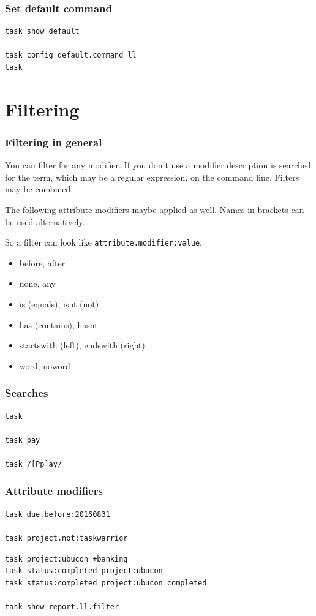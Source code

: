 \documentclass[t,handout]{beamer}
\begin{document}
\begin{frame}[fragile]\frametitle{Set default command}
    \vfill
    \begin{lstlisting}
task show default

task config default.command ll
task\end{lstlisting}
\end{frame}

\section{Filtering}

\begin{frame}[fragile]\frametitle{Filtering in general}
    You can filter for any modifier. If you don't use a modifier description is searched for the term, which may be a regular expression, on the command line. Filters may be combined.

    The following attribute modifiers maybe applied as well. Names in brackets can be used alternatively.

    So a filter can look like \verb=attribute.modifier:value=.

    \begin{itemize}
        \item before, after
        \item none, any
        \item is (equals), isnt (not)
        \item has (contains), hasnt
        \item startswith (left), endswith (right)
        \item word, noword
    \end{itemize}
\end{frame}

\begin{frame}[fragile]\frametitle{Searches}
    \vfill
    \begin{lstlisting}
task

task pay

task /[Pp]ay/\end{lstlisting}
\end{frame}

\begin{frame}[fragile]\frametitle{Attribute modifiers}
    \vfill
    \begin{lstlisting}
task due.before:20160831

task project.not:taskwarrior\end{lstlisting} \pause

    \begin{lstlisting}
task project:ubucon +banking
task status:completed project:ubucon
task status:completed project:ubucon completed

task show report.ll.filter\end{lstlisting}
\end{frame}
\end{document}
